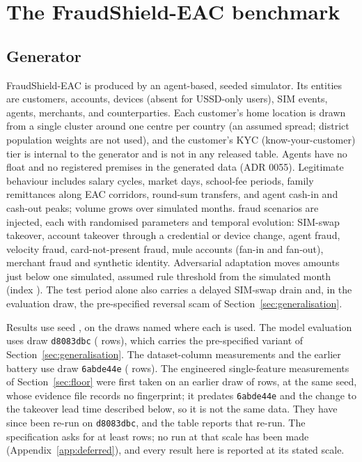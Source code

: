 \section{The FraudShield-EAC benchmark}
\label{sec:dataset}

\subsection{Generator}

FraudShield-EAC is produced by an agent-based, seeded simulator. Its entities are customers,
accounts, devices (absent for USSD-only users), SIM events, agents, merchants, and counterparties.
Each customer's home location is drawn from a single cluster around one centre per country (an
assumed spread; district population weights are not used), and the customer's KYC (know-your-customer) tier is internal
to the generator and is not in any released table. Agents have no float and no registered premises
in the generated data (ADR 0055). Legitimate behaviour includes salary cycles, market days,
school-fee periods, family remittances along EAC corridors, round-sum transfers, and agent cash-in
and cash-out peaks; volume grows over \nMonths{} simulated months. \nScenariosCap{} fraud scenarios
are injected, each with randomised parameters and temporal evolution: SIM-swap takeover, account
takeover through a credential or device change, agent fraud, velocity fraud, card-not-present
fraud, mule accounts (fan-in and fan-out), merchant fraud and synthetic identity. Adversarial
adaptation moves amounts just below one simulated, assumed rule threshold from the
\nAdaptMonthOrdinal{} simulated month (index \nAdaptMonthIndex{}). The test period alone also carries a delayed SIM-swap drain and, in
the evaluation draw, the pre-specified reversal scam of Section~\ref{sec:generalisation}.

Results use seed \nSeed{}, on the draws named where each is used. The model evaluation
uses draw \texttt{d8083dbc} (\nRowsDrawB{} rows), which carries the pre-specified variant of
Section~\ref{sec:generalisation}. The dataset-column measurements and the earlier battery use draw
\texttt{6abde44e} (\nRowsDrawA{} rows). The engineered single-feature measurements of
Section~\ref{sec:floor} were first taken on an earlier draw of \nFloorDrawRows{} rows, at the same
seed, whose evidence file records no fingerprint; it predates \texttt{6abde44e} and the change to the
takeover lead time described below, so it is not the same data. They have since been re-run on
\texttt{d8083dbc}, and the table reports that re-run. The specification asks for at least
\nSpecRows{} rows; no run at that scale has been made (Appendix~\ref{app:deferred}), and every
result here is reported at its stated scale.

